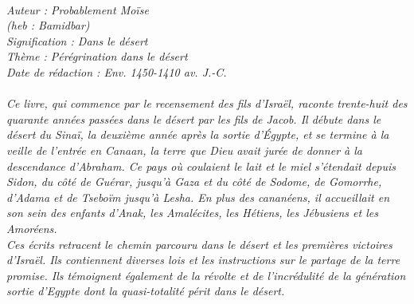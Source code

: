 \BFont
\noindent\hrulefill
{\footnotesize
\textit{
\bigskip
{\centering{}
\\Auteur : Probablement Moïse
\\(heb : Bamidbar)
\\Signification : Dans le désert
\\Thème : Pérégrination dans le désert
\\Date de rédaction : Env. 1450-1410 av. J.-C.\\}
}
\textit{
\\Ce livre, qui commence par le recensement des fils d’Israël, raconte trente-huit des quarante années passées dans le désert par les fils de Jacob. Il débute dans le désert du Sinaï, la deuxième année après la sortie d’Égypte, et se termine à la veille de l’entrée en Canaan, la terre que Dieu avait jurée de donner à la descendance d’Abraham. Ce pays où coulaient le lait et le miel s’étendait depuis Sidon, du côté de Guérar, jusqu’à Gaza et du côté de Sodome, de Gomorrhe, d’Adama et de Tseboïm jusqu’à Lesha. En plus des cananéens, il accueillait en son sein des enfants d’Anak, les Amalécites, les Hétiens, les Jébusiens et les Amoréens.
\\Ces écrits retracent le chemin parcouru dans le désert et les premières victoires d’Israël. Ils contiennent diverses lois et les instructions sur le partage de la terre promise. Ils témoignent également de la révolte et de l’incrédulité de la génération sortie d’Egypte dont la quasi-totalité périt dans le désert.\bigskip
}
}
\par\nobreak\noindent\hrulefill
